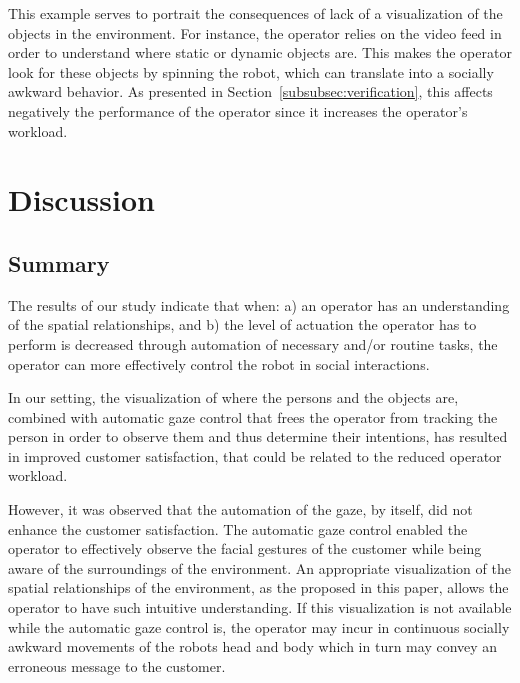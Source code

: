\documentclass[journal]{IEEEtran}
\begin{document}
This example serves to portrait the consequences of lack of a visualization of the objects in the environment.
For instance, the operator relies on the video feed in order to understand where static or dynamic objects are. 
This makes the operator look for these objects by spinning the robot, which can translate into a socially awkward behavior.
As presented in Section~\ref{subsubsec:verification}, this affects negatively the performance of the operator since it increases the operator's workload.


\section{Discussion}

\subsection{Summary}
The results of our study indicate that when: a) an operator has an understanding of the spatial relationships, and b) the level of actuation the operator has to perform is decreased through automation of necessary and/or routine tasks, the operator can more effectively control the robot in social interactions.

In our setting, the visualization of where the persons and the objects are, combined with automatic gaze control that frees the operator from tracking the person in order to observe them and thus determine their intentions, has resulted in improved customer satisfaction, that could be related to the reduced operator workload.

However, it was observed that the automation of the gaze, by itself, did not enhance the customer satisfaction.
The automatic gaze control enabled the operator to effectively observe the facial gestures of the customer while being aware of the surroundings of the environment.
An appropriate visualization of the spatial relationships of the environment, as the proposed in this paper, allows the operator to have such intuitive understanding.
If this visualization is not available while the automatic gaze control is, the operator may incur in continuous socially awkward movements of the robots head and body which in turn may convey an erroneous message to the customer. 
\end{document}
